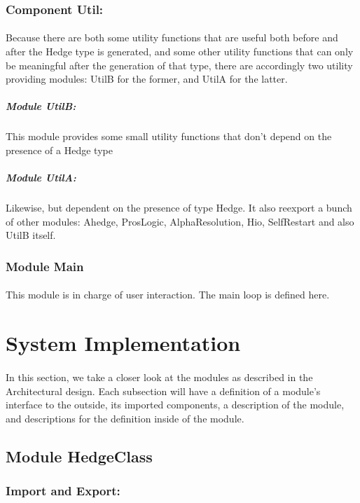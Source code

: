 \documentclass[../gr-final.tex]{subfiles}
\begin{document}
\subsubsection{Component Util:}
\paragraph{} Because there are both some utility functions that are useful
both before and after the Hedge type is generated, and some other
utility functions that can only be meaningful after the generation of
that type, there are accordingly two utility providing modules: UtilB
for the former, and UtilA for the latter.
\subparagraph{Module UtilB:} This module provides some small utility
functions that don't depend on the presence of a Hedge type
\subparagraph{Module UtilA:} Likewise, but dependent on the presence of
type Hedge. It also reexport a bunch of other modules: Ahedge,
ProsLogic, AlphaResolution, Hio, SelfRestart and also UtilB itself.

\subsubsection{Module Main}

\paragraph{}This module is in charge of user interaction. The main
loop is defined here.
\section{System Implementation}
\paragraph{} In this section, we take a closer look at the modules as
described in the Architectural design. Each subsection will have a
definition of a module's interface to the outside, its imported
components, a description of the module, and descriptions for the
definition inside of the module.
\subsection{Module HedgeClass}
\subsubsection{Import and Export:}
\end{document}
